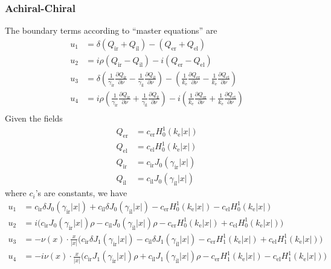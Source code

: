 \subsubsection{Achiral-Chiral}

The boundary terms according to ``master equations'' are
\begin{align*}
  u_1 &= \delta(Q_\text{ir} + Q_\text{il}) - (Q_\text{er} + Q_\text{el})\\
  u_2 &= i\rho(Q_\text{ir} - Q_\text{il}) -i(Q_\text{er} - Q_\text{el}) \\
  u_3 &=\delta\left(\frac{1}{\gamma_\text{ir}}\frac{\partial Q_\text{ir}}{\partial\nu} - \frac{1}{\gamma_\text{il}}\frac{\partial Q_\text{il}}{\partial\nu}\right) -\left(\frac{1}{k_\text{e}}\frac{\partial Q_\text{er}}{\partial\nu} - \frac{1}{k_\text{e}}\frac{\partial Q_\text{el}}{\partial\nu}\right) \\
  u_4 &=i\rho\left(\frac{1}{\gamma_\text{ir}}\frac{\partial Q_\text{ir}}{\partial\nu} + \frac{1}{\gamma_\text{il}}\frac{\partial Q_\text{il}}{\partial\nu}\right) -i\left(\frac{1}{k_\text{e}}\frac{\partial Q_\text{er}}{\partial\nu} + \frac{1}{k_\text{e}}\frac{\partial Q_\text{el}}{\partial\nu}\right) \\
\end{align*}
Given the fields
\begin{align*}
  Q_\text{er} &= c_\text{er}H_0^1(k_\text{e}|x|) \\
  Q_\text{el} &= c_\text{el}H_0^1(k_\text{e}|x|) \\
  Q_\text{ir} &= c_\text{ir}J_0(\gamma_\text{ir}|x|) \\
  Q_\text{il} &= c_\text{il}J_0(\gamma_\text{il}|x|)
\end{align*}
where $c_i$'s are constants, we have
\begin{align*}
  u_1 &= c_\text{ir} \delta J_0(\gamma_\text{ir}|x|)+c_\text{il} \delta J_0(\gamma_\text{il}|x|)-c_\text{er} H_0^1(k_\text{e}|x|)-c_\text{el} H_0^1(k_\text{e}|x|)\\
  u_2 &= i \bigl(c_\text{ir} J_0(\gamma_\text{ir}|x|) \rho-c_\text{il} J_0(\gamma_\text{il}|x|) \rho-c_\text{er} H_0^1(k_\text{e}|x|)+c_\text{el} H_0^1(k_\text{e}|x|)\bigr)\\
  u_3 &=-\nu(x)\cdot\frac{x}{|x|} \bigl(c_\text{ir} \delta J_1(\gamma_\text{ir}|x|)-c_\text{il} \delta J_1(\gamma_\text{il}|x|)-c_\text{er} H_1^1(k_\text{e}|x|)+c_\text{el} H_1^1(k_\text{e}|x|)\bigr) \\
  u_4 &=-i \nu(x)\cdot\frac{x}{|x|} \bigl(c_\text{ir} J_1(\gamma_\text{ir}|x|) \rho+c_\text{il} J_1(\gamma_\text{il}|x|) \rho-c_\text{er} H_1^1(k_\text{e}|x|)-c_\text{el} H_1^1(k_\text{e}|x|)\bigr)\\
\end{align*}

